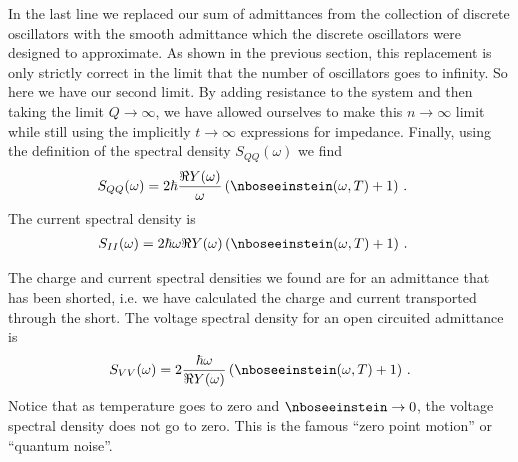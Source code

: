 In the last line we replaced our sum of admittances from the collection of discrete oscillators with the smooth admittance which the discrete oscillators were designed to approximate.
As shown in the previous section, this replacement is only strictly correct in the limit that the number of oscillators goes to infinity.
So here we have our second limit.
By adding resistance to the system and then taking the limit $Q \rightarrow \infty$, we have allowed ourselves to make this $n \rightarrow \infty$ limit while still using the implicitly  $t \rightarrow \infty$ expressions for impedance.
Finally, using the definition of the spectral density $S_{QQ}(\omega)$ we find
\begin{align}
  S_{QQ}(\omega)
  &= 2 \hbar \frac{\Re Y(\omega)}{\omega} \left( \nboseeinstein(\omega, T) + 1 \right)
  \, .
\end{align}
The current spectral density is
\begin{align}
S_{II}(\omega)
  &= 2 \hbar \omega \Re Y(\omega) \left( \nboseeinstein(\omega, T) + 1 \right)
  \, .
\end{align}

The charge and current spectral densities we found are for an admittance that has been shorted, i.e. we have calculated the charge and current transported through the short.
The voltage spectral density for an open circuited admittance is
\begin{equation}
  S_{VV}(\omega) = 2 \frac{\hbar \omega}{\Re Y(\omega)} \left( \nboseeinstein(\omega, T) + 1 \right)
  \, .
\end{equation}
Notice that as temperature goes to zero and $\nboseeinstein \rightarrow 0$, the voltage spectral density does not go to zero.
This is the famous ``zero point motion'' or ``quantum noise''.
